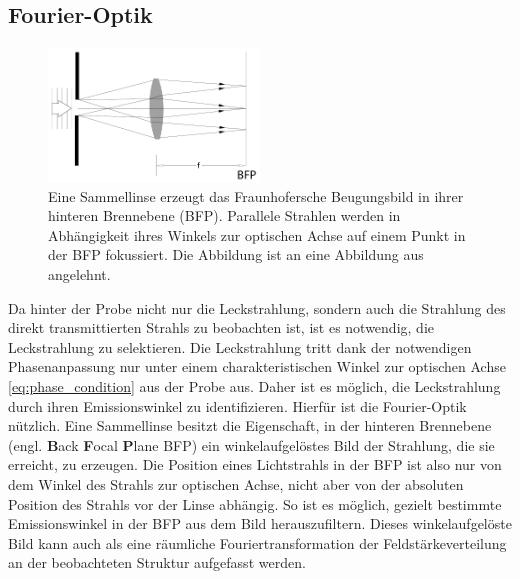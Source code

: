 \documentclass[a4paper, titlepage,  ngerman]{book}
\begin{document}
	\subsection{Fourier-Optik}
	\label{sec:fourier}
	\begin{figure} 
		\centering
		\includegraphics[width=0.5\textwidth]{figures/FourierLinse.pdf}
		\caption[Fourieroptik]{Eine Sammellinse erzeugt das Fraunhofersche Beugungsbild in ihrer hinteren Brennebene (BFP). Parallele Strahlen werden in Abhängigkeit ihres Winkels zur optischen Achse auf einem Punkt in der BFP fokussiert. Die Abbildung ist an eine Abbildung aus \cite{Hecht.2018} angelehnt.}
		\label{fig:FourierLinse}
	\end{figure}
	Da hinter der Probe nicht nur die Leckstrahlung, sondern auch die Strahlung des direkt transmittierten Strahls zu beobachten ist, ist es notwendig, die Leckstrahlung zu selektieren. Die Leckstrahlung tritt dank der notwendigen Phasenanpassung nur unter einem charakteristischen Winkel zur optischen Achse \eqref{eq:phase_condition} aus der Probe aus. Daher ist es möglich, die Leckstrahlung durch ihren Emissionswinkel zu identifizieren. Hierfür ist die Fourier-Optik nützlich. Eine Sammellinse besitzt die Eigenschaft, in  der hinteren Brennebene (engl. \textbf{B}ack \textbf{F}ocal \textbf{P}lane BFP) ein winkelaufgelöstes Bild der Strahlung, die sie erreicht, zu erzeugen\cite{Hecht.1996}. Die Position eines Lichtstrahls in der BFP ist also nur von dem Winkel des Strahls zur optischen Achse, nicht aber von der absoluten Position des Strahls vor der Linse abhängig. So ist es möglich, gezielt bestimmte Emissionswinkel in der BFP aus dem Bild herauszufiltern. Dieses winkelaufgelöste Bild kann auch als eine räumliche Fouriertransformation der Feldstärkeverteilung an der beobachteten Struktur aufgefasst werden. 
	
\end{document}

